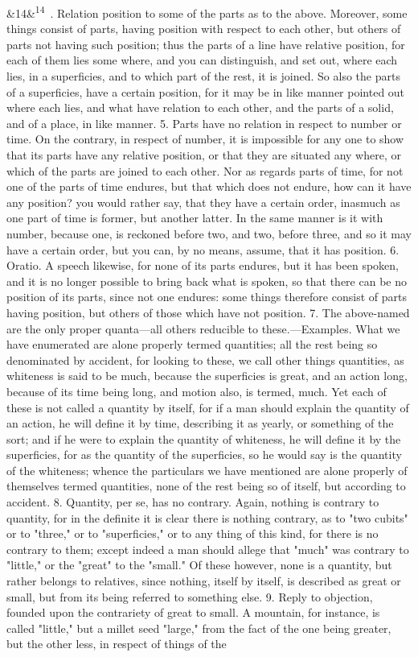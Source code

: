 \documentclass[12pt]{article}
\newcommand{\para}[1][]{\par\noindent\ifx&#1&\else\textsuperscript{\footnotesize #1}~\fi}
\begin{document}
\para[14] 4. Relation position to some of the parts as to the above. Moreover, some things consist of parts, having position with respect to each other, but others of parts not having such position; thus the parts of a line have relative position, for each of them lies some where, and you can distinguish, and set out, where each lies, in a superficies, and to which part of the rest, it is joined. So also the parts of a superficies, have a certain position, for it may be in like manner pointed out where each lies, and what have relation to each other, and the parts of a solid, and of a place, in like manner. 5. Parts have no relation in respect to number or time. On the contrary, in respect of number, it is impossible for any one to show that its parts have any relative position, or that they are situated any where, or which of the parts are joined to each other. Nor as regards parts of time, for not one of the parts of time endures, but that which does not endure, how can it have any position? you would rather say, that they have a certain order, inasmuch as one part of time is former, but another latter. In the same manner is it with number, because one, is reckoned before two, and two, before three, and so it may have a certain order, but you can, by no means, assume, that it has position. 6. Oratio. A speech likewise, for none of its parts endures, but it has been spoken, and it is no longer possible to bring back what is spoken, so that there can be no position of its parts, since not one endures: some things therefore consist of parts having position, but others of those which have not position. 7. The above-named are the only proper quanta---all others reducible to these.---Examples. What we have enumerated are alone properly termed quantities; all the rest being so denominated by accident, for looking to these, we call other things quantities, as whiteness is said to be much, because the superficies is great, and an action long, because of its time being long, and motion also, is termed, much. Yet each of these is not called a quantity by itself, for if a man should explain the quantity of an action, he will define it by time, describing it as yearly, or something of the sort; and if he were to explain the quantity of whiteness, he will define it by the superficies, for as the quantity of the superficies, so he would say is the quantity of the whiteness; whence the particulars we have mentioned are alone properly of themselves termed quantities, none of the rest being so of itself, but according to accident. 8. Quantity, per se, has no contrary. Again, nothing is contrary to quantity, for in the definite it is clear there is nothing contrary, as to "two cubits" or to "three," or to "superficies," or to any thing of this kind, for there is no contrary to them; except indeed a man should allege that "much" was contrary to "little," or the "great" to the "small." Of these however, none is a quantity, but rather belongs to relatives, since nothing, itself by itself, is described as great or small, but from its being referred to something else. 9. Reply to objection, founded upon the contrariety of great to small. A mountain, for instance, is called "little," but a millet seed "large," from the fact of the one being greater, but the other less, in respect of things of the 
\end{document}
